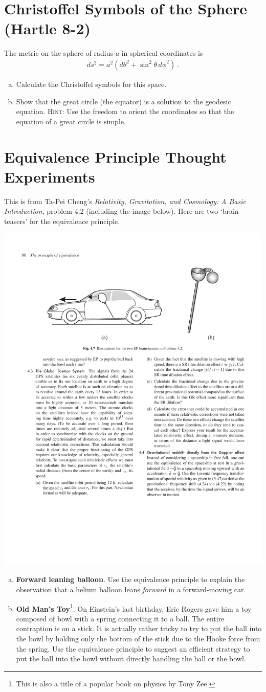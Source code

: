 \documentclass[12pt]{article}
\numberwithin{equation}{section}    %
\begin{document}
\section{Christoffel Symbols of the Sphere (Hartle 8-2)}

The metric on the sphere of radius $a$ in spherical coordinates is
\begin{align}
	ds^2 = a^2 \left(d\theta^2 + \sin^2\theta \, d\phi^2\right) \ .
\end{align}
\begin{enumerate}[(a)]
\item Calculate the Christoffel symbols	for this space.
\item Show that the great circle (the equator) is a solution to the geodesic equation. \textsc{Hint}: Use the freedom to orient the coordinates so that the equation of a great circle is simple.
\end{enumerate}


\section{Equivalence Principle Thought Experiments}

This is from Ta-Pei Cheng's \emph{Relativity, Gravitation, and Cosmology: A Basic Introduction}, problem 4.2 (including the image below). Here are two `brain teasers' for the equivalence principle. 
\begin{center}
	\includegraphics[width=.5\textwidth]{FromCheng}
\end{center}
\begin{enumerate}[(a)]
\item \textbf{Forward leaning balloon}. Use the equivalence principle to explain the observation that a helium balloon leans \emph{forward} in a forward-moving car.
\item \textbf{Old Man's Toy}\footnote{This is also a title of a popular book on physics by Tony Zee.}. On Einstein's last birthday, Eric Rogers gave him a toy composed of bowl with a spring connecting it to a ball. The entire contraption is on a stick. It is actually rather tricky to try to put the ball into the bowl by holding only the bottom of the stick due to the Hooke force from the spring. Use the equivalence principle to suggest an efficient strategy to put the ball into the bowl without directly handling the ball or the bowl.
\end{enumerate}
\end{document}
